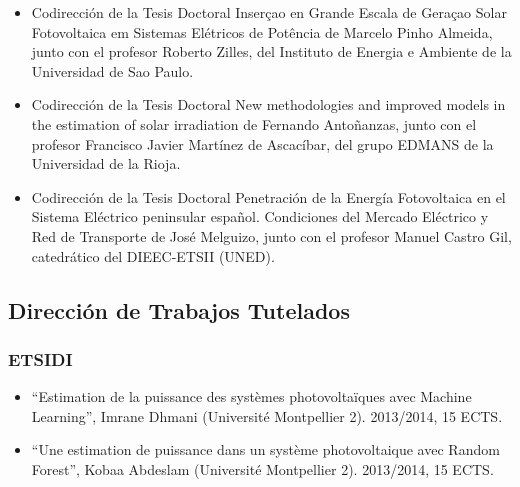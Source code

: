 \documentclass[article, a4paper]{memoir}
\begin{document}
\begin{itemize}
\item Codirección de la Tesis Doctoral \guillemotleft{}Inserçao en Grande Escala de Geraçao Solar Fotovoltaica em Sistemas Elétricos de Potência\guillemotright{} de Marcelo Pinho Almeida, junto con el profesor Roberto Zilles, del Instituto de Energia e Ambiente de la Universidad de Sao Paulo.

\item Codirección de la Tesis Doctoral \guillemotleft{}New methodologies and improved models in the estimation of solar irradiation\guillemotright{} de Fernando Antoñanzas, junto con el profesor Francisco Javier Martínez de Ascacíbar, del grupo EDMANS de la Universidad de la Rioja.

\item Codirección de la Tesis Doctoral \guillemotleft{}Penetración de la Energía Fotovoltaica en el Sistema Eléctrico peninsular español. Condiciones del Mercado Eléctrico y Red de Transporte\guillemotright{} de José Melguizo, junto con el profesor Manuel Castro Gil, catedrático del DIEEC-ETSII (UNED).
\end{itemize}


\subsection{Dirección de Trabajos Tutelados}
\label{sec-5-3}
\subsubsection{ETSIDI}
\label{sec-5-3-1}
\begin{itemize}
\item “Estimation de la puissance des systèmes photovoltaïques avec Machine Learning”, Imrane Dhmani (Université Montpellier 2). 2013/2014, 15 ECTS.
\item “Une estimation de puissance dans un système photovoltaique avec Random Forest”, Kobaa Abdeslam (Université Montpellier 2). 2013/2014, 15 ECTS.
\end{itemize}
\end{document}
